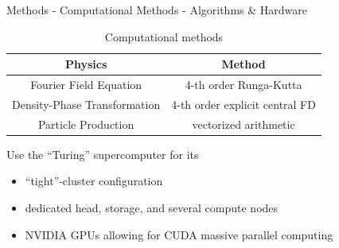 \documentclass[aspectratio=169]{beamer}
\begin{document}
        \begin{frame}{Methods - Computational Methods - Algorithms \& Hardware}
            \begin{table}[h]
                \centering
                \begin{tabular}{c|c}
                    \textbf{Physics} & \textbf{Method} \\
                    \hline
                    Fourier Field Equation & 4-th order Runga-Kutta \\
                    \hline
                    Density-Phase Transformation & 4-th order explicit central FD \\
                    \hline
                    Particle Production & vectorized arithmetic
                \end{tabular}
                \caption{Computational methods}
                \label{tab:methods}
            \end{table}
            \vspace{-0.2in}
            Use the ``Turing'' supercomputer for its
            \begin{itemize}
                \item ``tight''-cluster configuration
                \item dedicated head, storage, and several compute nodes
                \item NVIDIA GPUs allowing for CUDA massive parallel computing
            \end{itemize}
        \end{frame}
\end{document}
